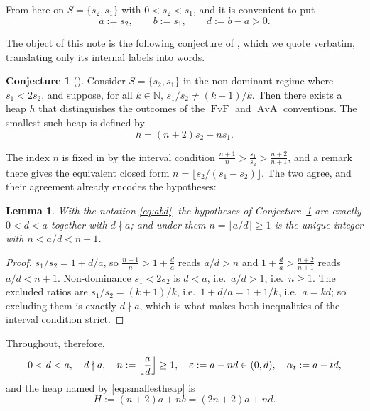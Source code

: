 \documentclass[11pt]{amsart}
\newtheorem{lemma}[theorem]{Lemma}
\theoremstyle{definition}
\newtheorem{conjecture}{Conjecture}
\theoremstyle{remark}
\DeclareMathOperator{\FvF}{FvF}
\DeclareMathOperator{\AvA}{AvA}
\begin{document}
From here on $S=\{s_2,s_1\}$ with $0<s_2<s_1$, and it is convenient to put
\begin{equation}\label{eq:abd}
  a:=s_2,\qquad b:=s_1,\qquad d:=b-a>0 .
\end{equation}

The object of this note is the following conjecture of \cite{BKLM}, which we
quote verbatim, translating only its internal labels into words.

\begin{conjecture}[\cite{BKLM}]\label{con:halfline}
Consider $S=\{s_2,s_1\}$ in the non-dominant regime where $s_1<2s_2$, and
suppose, for all $k\in\mathbb N$, $s_1/s_2\neq(k+1)/k$. Then there exists a
heap $h$ that distinguishes the outcomes of the $\FvF$ and $\AvA$ conventions.
The smallest such heap is defined by
\begin{equation}\label{eq:smallestheap}
  h=(n+2)s_2+ns_1 .
\end{equation}
\end{conjecture}

The index $n$ is fixed in \cite{BKLM} by the interval condition
$\frac{n+1}{n}>\frac{s_1}{s_2}>\frac{n+2}{n+1}$, and a remark there gives the
equivalent closed form $n=\lfloor s_2/(s_1-s_2)\rfloor$. The two agree, and
their agreement already encodes the hypotheses:

\begin{lemma}\label{lem:hyp}
With the notation \eqref{eq:abd}, the hypotheses of
Conjecture~\ref{con:halfline} are exactly $0<d<a$ together with $d\nmid a$; and
under them $n=\lfloor a/d\rfloor\ge1$ is the unique integer with
$n<a/d<n+1$.
\end{lemma}

\begin{proof}
$s_1/s_2=1+d/a$, so $\frac{n+1}{n}>1+\frac da$ reads $a/d>n$ and
$1+\frac da>\frac{n+2}{n+1}$ reads $a/d<n+1$. Non-dominance $s_1<2s_2$ is
$d<a$, i.e.\ $a/d>1$, i.e.\ $n\ge1$. The excluded ratios are
$s_1/s_2=(k+1)/k$, i.e.\ $1+d/a=1+1/k$, i.e.\ $a=kd$; so excluding them is
exactly $d\nmid a$, which is what makes both inequalities of the interval
condition strict.
\end{proof}

Throughout, therefore,
\begin{equation}\label{eq:data}
  0<d<a,\quad d\nmid a,\quad
  n:=\Bigl\lfloor\frac ad\Bigr\rfloor\ge1,\quad
  \varepsilon:=a-nd\in(0,d),\quad
  \alpha_t:=a-td,
\end{equation}
and the heap named by \eqref{eq:smallestheap} is
\begin{equation}\label{eq:H}
  H:=(n+2)a+nb=(2n+2)a+nd .
\end{equation}
\end{document}
